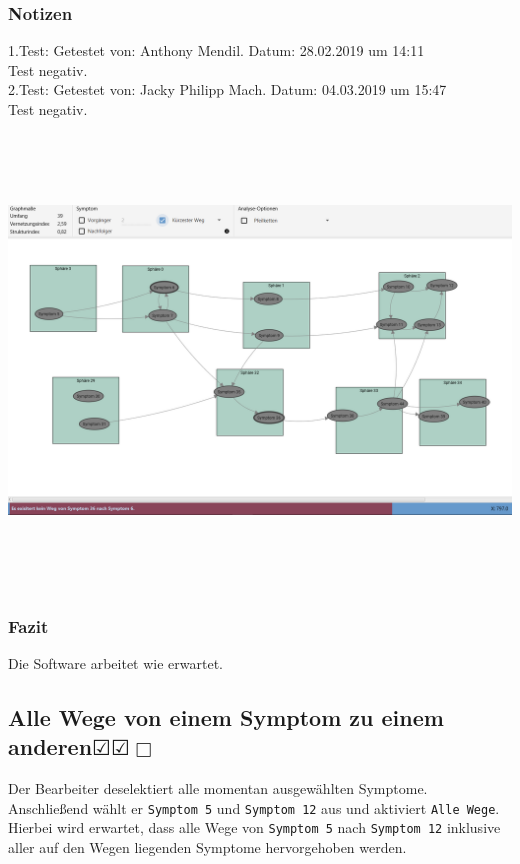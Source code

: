 \documentclass[enabledeprecatedfontcommands]{scrartcl}
\newcommand{\subsectiont}[2]{\subsection[#1]{#1{\normalsize\normalfont #2}}}
\newcommand{\leer}{$\Box$}
\newcommand{\ok}{$\CheckedBox$}
\begin{document}
\subsubsection{Notizen}
1.Test: Getestet von: Anthony Mendil. Datum: 28.02.2019 um 14:11 \\
Test negativ. \\
2.Test: Getestet von: Jacky Philipp Mach. Datum: 04.03.2019 um 15:47 \\
Test negativ.
\begin{center}
\includegraphics[height=12cm, angle=90]{analysekuerzesterWegExistiertNicht.PNG}
\end{center}
\subsubsection{Fazit}
Die Software arbeitet wie erwartet.

\subsectiont{Alle Wege von einem Symptom zu einem anderen}{\dotfill\ok\ok\leer}
Der Bearbeiter deselektiert alle momentan ausgewählten Symptome. Anschließend wählt er \texttt{Symptom 5} und \texttt{Symptom 12} aus und aktiviert \texttt{Alle Wege}. Hierbei wird erwartet, dass alle Wege von \texttt{Symptom 5} nach \texttt{Symptom 12} inklusive aller auf den Wegen liegenden Symptome hervorgehoben werden. 
\end{document}
